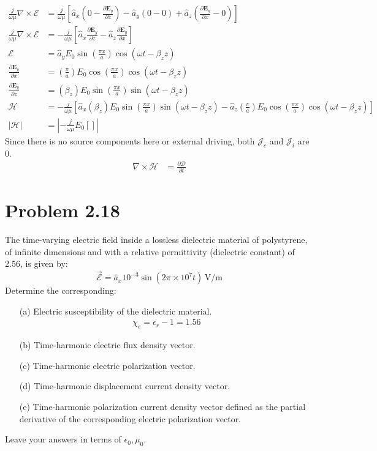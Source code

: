 \documentclass[12pt]{article}
\begin{document}
\begin{align*}
  \frac{j}{\omega\mu}  \nabla \times \bm{\mathcal{E}} &=  \frac{j}{\omega\mu} \left[\hat a_x\left(0 - \frac{\partial\bm{E}_y}{\partial z}\right) - \hat a_y\left( 0 - 0  \right) + \hat a_z\left( \frac{\partial\bm{E}_y}{\partial x} -  0\right)\right] \\
  \frac{j}{\omega\mu}  \nabla \times \bm{\mathcal{E}} &=  -\frac{j}{\omega\mu} \left[\hat a_x \frac{\partial\bm{E}_y}{\partial z} - \hat a_z \frac{\partial\bm{E}_y}{\partial x}\right]\\
  \bm{\mathcal{E}} &= \hat{a}_y E_0 \sin\left(\frac{\pi x}{a}\right) \cos(\omega t - \beta_z z)\\
  \frac{\partial\bm{E}_y}{\partial x} &= \left( \frac{\pi}{a}\right) E_0 \cos\left(\frac{\pi x}{a}\right)\cos(\omega t - \beta_z z) \\
  \frac{\partial\bm{E}_y}{\partial z} &= \left( \beta_z\right) E_0 \sin\left(\frac{\pi x}{a}\right)\sin(\omega t - \beta_z z) \\
  \bm{\mathcal{H}} &= -\frac{j}{\omega\mu} \left[\hat a_x \left( \beta_z\right) E_0 \sin\left(\frac{\pi x}{a}\right)\sin(\omega t - \beta_z z) - \hat a_z \left( \frac{\pi}{a}\right) E_0 \cos\left(\frac{\pi x}{a}\right)\cos(\omega t - \beta_z z)\right]\\
   |\bm{\mathcal{H}}| &= |-\frac{j}{\omega\mu} E_0\left[\right]|
\end{align*}
Since there is no source components here or external driving, both $\bm{\mathcal{J}}_c$ and $\bm{\mathcal{J}}_i$ are 0.
\begin{align*}
  \nabla \times \bm{\mathcal{H}} &= \frac{\partial \bm{\mathcal{D}}}{\partial t}
\end{align*}

\newpage
\section*{Problem 2.18}
The time-varying electric field inside a lossless dielectric material of polystyrene, of infinite dimensions and with a relative permittivity (dielectric constant) of 2.56, is given by:
\[
\vec{\mathcal{E}} = \hat{a}_x 10^{-3} \sin(2\pi \times 10^7 t) \, \text{V/m}
\]
Determine the corresponding:
\begin{itemize}
\item[(a)] Electric susceptibility of the dielectric material.
  \begin{align*}
    \chi_e = \epsilon_r - 1 = 1.56
  \end{align*}
    \item[(b)] Time-harmonic electric flux density vector.
    \item[(c)] Time-harmonic electric polarization vector.
    \item[(d)] Time-harmonic displacement current density vector.
    \item[(e)] Time-harmonic polarization current density vector defined as the partial derivative of the corresponding electric polarization vector.
\end{itemize}
Leave your answers in terms of \( \epsilon_0, \mu_0 \).
\end{document}
